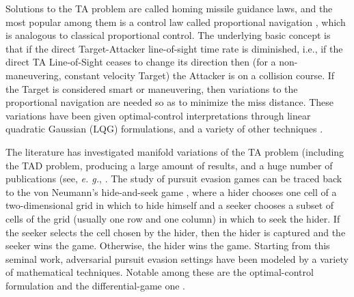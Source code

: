 Solutions to the TA problem are called homing missile guidance laws, and the most popular among them is a control law called proportional navigation \cite{adler1956missile,becker1990closed,ghose1994generalization}, which is analogous to classical proportional control. The underlying basic concept is that if the direct Target-Attacker line-of-sight time rate is diminished, i.e., if the direct TA Line-of-Sight ceases to change its direction then (for a non-maneuvering, constant velocity Target) the Attacker is on a collision course. If the Target is considered smart or maneuvering, then variations to the proportional navigation are needed so as to minimize the miss distance. These variations have been given optimal-control interpretations through linear quadratic Gaussian (LQG) formulations, and a variety of other techniques \cite{gutman2012optimal,shinar1980three,nesline2012new,anderson2012comparison,pastrick2012guidance,rodin1987pursuit,rodin1989pursuit,lin1991modern,cochran1991analytical,le1998determining,creaser1998generation,siouris2004missile,lechevin2004lyapunov,lee2007guidance,breivik2008guidance,rusnak2008guidance, shinar2009meeting,lin2010development,shneydor1998missile,pham2012fuzzy,white2012advances,li2014fuzzy,cho2014optimal,grinfeld2015minimal,zarchan1999ballistic,zarchan2000tracking,zarchan2011kill,zarchan2002tactical}.

The literature has investigated manifold variations of the TA problem (including the TAD problem, producing a large amount of results, and a huge number of publications (see, \textit{e. g.}, \cite{rodin1987pursuit,rodin1989pursuit,pearce2013tactical,chung2011search,weiss2017combined,garcia2017optimal}. The study of pursuit evasion games can be traced back to the von Neumann’s hide-and-seek game \cite{flood1972hide}, where a hider chooses one cell of a two-dimensional grid in which to hide himself and a seeker chooses a subset of cells of the grid (usually one row and one column) in which to seek the hider. If the seeker selects the cell chosen by the hider, then the hider is captured and the seeker wins the game. Otherwise, the hider wins the game. Starting from this seminal work, adversarial pursuit evasion settings have been modeled by a variety of mathematical techniques. Notable among these are the optimal-control formulation and the differential-game one \cite{anderson2012comparison,turetsky2003missile,gutman20103d}. 

